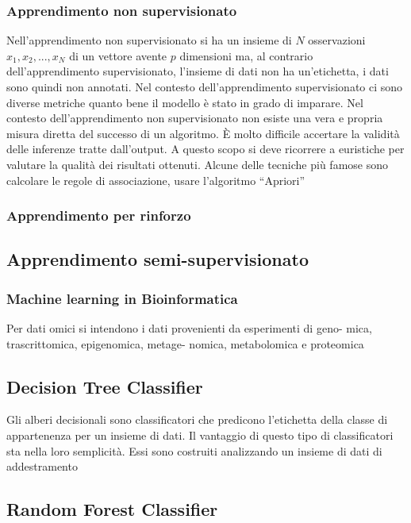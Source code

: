 \documentclass[12pt,italian]{report}
\begin{document}
	
	\subsubsection{Apprendimento non supervisionato}
	Nell'apprendimento non supervisionato si ha un insieme di $N$ osservazioni $x_1, x_2,...,x_N$ di un vettore avente $p$ dimensioni ma, al contrario dell'apprendimento supervisionato, l'insieme di dati non ha un'etichetta, i dati sono quindi non annotati.
	Nel contesto dell'apprendimento supervisionato ci sono diverse metriche quanto bene il modello è stato in grado di imparare. Nel contesto dell'apprendimento non supervisionato non esiste una vera e propria misura diretta del successo di un algoritmo. È molto difficile accertare la validità delle inferenze tratte dall'output. A questo scopo si deve ricorrere a euristiche per valutare la qualità dei risultati ottenuti. Alcune delle tecniche più famose sono calcolare le regole di associazione, usare l'algoritmo ``Apriori'' %
	
	
	\subsubsection{Apprendimento per rinforzo}
	\subsection{Apprendimento semi-supervisionato}
	
	
	\subsubsection{Machine learning in Bioinformatica}
	Per dati omici si intendono i dati provenienti da esperimenti di geno- mica, trascrittomica, epigenomica, metage- nomica, metabolomica e proteomica 
	\subsection{Decision Tree Classifier}
	Gli alberi decisionali sono classificatori che predicono l'etichetta della classe di appartenenza per un insieme di dati. Il vantaggio di questo tipo di classificatori sta nella loro semplicità. Essi sono costruiti analizzando un insieme di dati di addestramento 
	\subsection{Random Forest Classifier}
	
\end{document}
